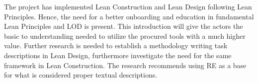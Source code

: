The project has implemented Lean Construction and Lean Design following Lean Principles. Hence, the need for a better onboarding and education in fundamental Lean Principles and LOD is present. This introduction will give the actors the basic to understanding needed to utilize the procured tools with a much higher value. Further research is needed to establish a methodology writing task descriptions in Lean Design, furthermore investigate the need for the same framework in Lean Construction. The research recommends using RE as a base for what is considered proper textual descriptions. 

\cleardoublepage
